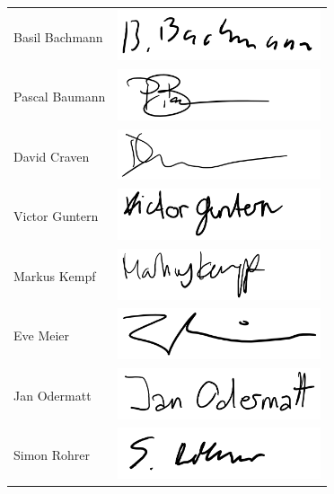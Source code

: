 \documentclass[a4paper]{report}
\begin{document}
\noindent
\begin{tabular}{lp{}}
	Basil Bachmann & \includegraphics[height=1.5cm,keepaspectratio]{BasilBachmann}\\
	Pascal Baumann & \includegraphics[height=1.5cm,keepaspectratio]{PascalBaumann}\\
	David Craven & \includegraphics[height=1.5cm,keepaspectratio]{DavidCraven}\\
	Victor Guntern & \includegraphics[height=1.5cm,keepaspectratio]{VictorGuntern}\\
	Markus Kempf & \includegraphics[height=1.5cm,keepaspectratio]{MarkusKempf}\\
	Eve Meier & \includegraphics[height=1.5cm,keepaspectratio]{EveMeier}\\
	Jan Odermatt & \includegraphics[height=1.5cm,keepaspectratio]{JanOdermatt}\\
	Simon Rohrer &  \includegraphics[height=1.5cm,keepaspectratio]{SimonRohrer}\\
\end{tabular}
\end{document}
